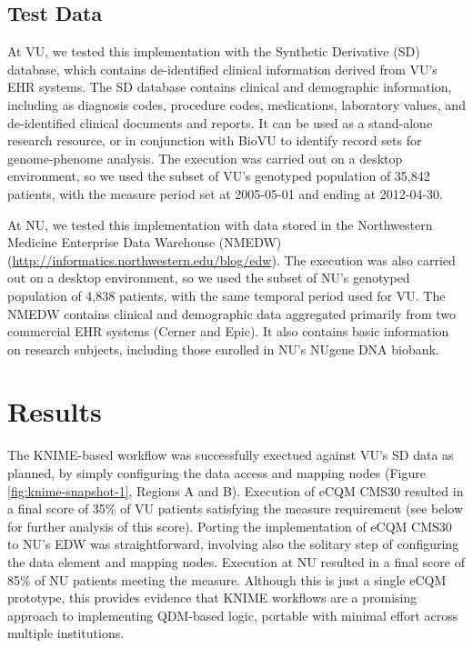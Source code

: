 \documentclass{article}
\begin{document}
\subsection{Test Data}

At VU, we tested this implementation with the Synthetic Derivative (SD) database\cite{roden_development_2008}, which contains de-identified clinical information derived from VU's EHR systems. The SD database contains clinical and demographic information, including as diagnosis codes, procedure codes, medications, laboratory values, and de-identified clinical documents and reports. It can be used as a stand-alone research resource, or in conjunction with BioVU to identify record sets for genome-phenome analysis. The execution was carried out on a desktop environment, so we used the subset of VU's genotyped population of 35,842 patients, with the measure period set at 2005-05-01 and ending at 2012-04-30.

At NU, we tested this implementation with data stored in the Northwestern Medicine Enterprise Data Warehouse (NMEDW) (\url{http://informatics.northwestern.edu/blog/edw}). The execution was also carried out on a desktop environment, so we used the subset of NU's genotyped population of 4,838 patients, with the same temporal period used for VU.  The NMEDW contains clinical and demographic data aggregated primarily from two commercial EHR systems (Cerner and Epic). It also contains basic information on research subjects, including those enrolled in NU's NUgene DNA biobank.


\section{Results}

The KNIME-based workflow was successfully exectued against VU's SD data as planned, by simply configuring the data access and mapping nodes (Figure \ref{fig:knime-snapshot-1}, Regions A and B). Execution of eCQM CMS30 resulted in a final score of 35\% of VU patients satisfying the measure requirement (see below for further analysis of this score). Porting the implementation of eCQM CMS30 to NU's EDW was straightforward, involving also the solitary step of configuring the data element and mapping nodes. Execution at NU resulted in a final score of 85\% of NU patients meeting the measure. Although this is just a single eCQM prototype, this provides evidence that KNIME workflows are a promising approach to implementing QDM-based logic, portable with minimal effort across multiple institutions.
\end{document}
